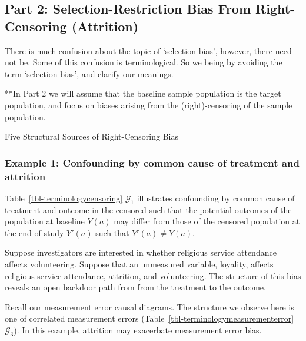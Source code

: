 \documentclass[
  single column]{article}
\begin{document}
\subsection{Part 2: Selection-Restriction Bias From Right-Censoring
(Attrition)}\label{part-2-selection-restriction-bias-from-right-censoring-attrition}

There is much confusion about the topic of `selection bias', however,
there need not be. Some of this confusion is terminological. So we being
by avoiding the term `selection bias', and clarify our meanings.

**In Part 2 we will assume that the baseline sample population is the
target population, and focus on biases arising from the
(right)-censoring of the sample population.

\begin{table}

\caption{\label{tbl-terminologycensoring}Five Structural Sources of
Right-Censoring Bias}

\centering{

\terminologycensoring

}

\end{table}%

\subsubsection{Example 1: Confounding by common cause of treatment and
attrition}\label{example-1-confounding-by-common-cause-of-treatment-and-attrition}

Table~\ref{tbl-terminologycensoring} \(\mathcal{G}_1\) illustrates
confounding by common cause of treatment and outcome in the censored
such that the potential outcomes of the population at baseline \(Y(a)\)
may differ from those of the censored population at the end of study
\(Y'(a)\) such that \(Y'(a) \neq Y(a)\).

Suppose investigators are interested in whether religious service
attendance affects volunteering. Suppose that an unmeasured variable,
loyality, affects religious service attendance, attrition, and
volunteering. The structure of this bias reveals an open backdoor path
from from the treatment to the outcome.

Recall our measurement error causal diagrams. The structure we observe
here is one of correlated measurement errors
(Table~\ref{tbl-terminologymeasurementerror} \(\mathcal{G}_3\)). In this
example, attrition may exacerbate measurement error bias.
\end{document}
